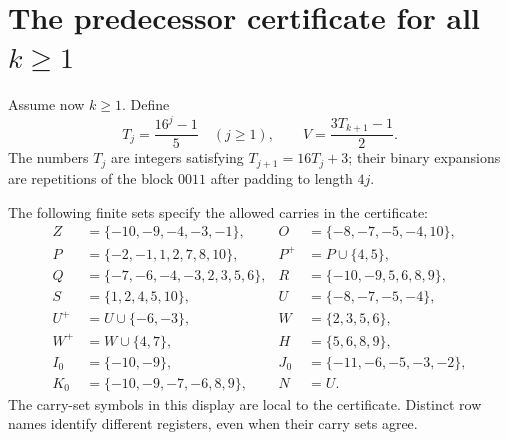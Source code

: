 \documentclass[11pt]{article}
\theoremstyle{remark}
\begin{document}
\section{The predecessor certificate for all \texorpdfstring{$k\ge1$}{k>=1}}
Assume now $k\ge1$. Define
\begin{equation}\label{family:eq:T}
 T_j=\frac{16^j-1}{5}\quad(j\ge1),\qquad
 V=\frac{3T_{k+1}-1}{2}.
\end{equation}
The numbers $T_j$ are integers satisfying $T_{j+1}=16T_j+3$;
their binary expansions are repetitions of the block $0011$ after
padding to length $4j$.

The following finite sets specify the allowed carries in the
certificate:
\begin{align*}
 Z&=\{-10,-9,-4,-3,-1\},&
 O&=\{-8,-7,-5,-4,10\},\\
 P&=\{-2,-1,1,2,7,8,10\},&
 P^+&=P\cup\{4,5\},\\
 Q&=\{-7,-6,-4,-3,2,3,5,6\},&
 R&=\{-10,-9,5,6,8,9\},\\
 S&=\{1,2,4,5,10\},&
 U&=\{-8,-7,-5,-4\},\\
 U^+&=U\cup\{-6,-3\},&
 W&=\{2,3,5,6\},\\
 W^+&=W\cup\{4,7\},&
 H&=\{5,6,8,9\},\\
 I_0&=\{-10,-9\},&
 J_0&=\{-11,-6,-5,-3,-2\},\\
 K_0&=\{-10,-9,-7,-6,8,9\},&
 N&=U.
\end{align*}
The carry-set symbols in this display are local to the certificate.
Distinct row names identify different registers, even when their
carry sets agree.
\end{document}
